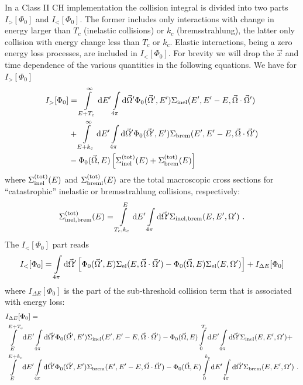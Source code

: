 In a Class II CH implementation the collision integral
is divided into two parts $I_>[\Phi_0]$ and $I_<[\Phi_0]$.
The former includes only interactions
with change in energy larger than $T_c$ (inelastic collisions)
or $k_c$ (bremsstrahlung), the latter only
collision with energy change less than
$T_c$ or $k_c$. Elastic interactions,
being a zero energy loss processes, are included in $I_<[\Phi_0]$.
For brevity we will drop the $\vec{x}$ and time dependence of the
various quantities in the following equations.
We have for $I_>[\Phi_0]$
\begin{equation}
\begin{split}
I_>[\Phi_0] & = \int\limits_{E+T_c}^\infty {\rm d}E' \int\limits_{4 \pi}
{\rm d} \vec{\Omega}' \Phi_0(\vec{\Omega}',E')
\Sigma_{\rm inel}(E',E'-E,\vec{\Omega}\cdot\vec{\Omega}') \\
& + \int\limits_{E+k_c}^\infty {\rm d}E' \int\limits_{4 \pi}
{\rm d} \vec{\Omega}' \Phi_0(\vec{\Omega}',E')
\Sigma_{\rm brem}(E',E'-E,\vec{\Omega}\cdot\vec{\Omega}')
\\
& - \Phi_0(\vec{\Omega},E)
\left[ \Sigma_{\rm inel}^{\rm (tot)}(E) + \Sigma_{\rm brem}^{\rm (tot)}(E)
\right]
\end{split}
\end{equation}
where $\Sigma_{\rm inel}^{\rm (tot)}(E)$ and
$\Sigma_{\rm breml}^{\rm (tot)}(E)$ are the total macroscopic
cross sections for ``catastrophic'' inelastic or bremsstrahlung
collisions, respectively:
\begin{equation}
\Sigma_{\rm inel,brem}^{\rm (tot)}(E) = \int\limits_{T_c,k_c}^E {\rm d} E'
\int\limits_{4 \pi} {\rm d}\vec{\Omega}'
\Sigma_{\rm inel,brem}(E,E',\Omega')~.
\end{equation}
The $I_<[\Phi_0]$ part reads
\begin{equation}
I_<[\Phi_0] = \int\limits_{4 \pi} {\rm d}\vec{\Omega}'
\left[ \Phi_0(\vec{\Omega}',E)
\Sigma_{\rm el}(E,\vec{\Omega}\cdot\vec{\Omega}') -
\Phi_0(\vec{\Omega},E) \Sigma_{\rm el}(E,\Omega') \right] +
I_{\Delta E}[\Phi_0]
\end{equation}
where $I_{\Delta E}[\Phi_0]$ is the part of the sub-threshold
collision term that is associated with energy loss:
\begin{equation}
\begin{split}
\label{I_deltaE1}
&
I_{\Delta E}[\Phi_0] = \\
&
 \int\limits_E^{E+T_c} {\rm d}E' \int\limits_{4 \pi}
{\rm d}\vec{\Omega}'\Phi_0(\vec{\Omega}',E')
\Sigma_{\rm inel}(E',E'-E,\vec{\Omega}\cdot\vec{\Omega}') -
\Phi_0(\vec{\Omega},E)
\int\limits_0^{T_c} {\rm d}E' \int\limits_{4 \pi} {\rm d}\vec{\Omega}'
\Sigma_{\rm inel}(E,E',\Omega') + \\
&
\int\limits_E^{E+k_c} {\rm d}E' \int\limits_{4 \pi}
{\rm d}\vec{\Omega}'\Phi_0(\vec{\Omega}',E')
\Sigma_{\rm brem} (E',E'-E,\vec{\Omega}\cdot\vec{\Omega}') -
\Phi_0(\vec{\Omega},E)
\int\limits_0^{k_c} {\rm d}E' \int\limits_{4 \pi} {\rm d}\vec{\Omega}'
\Sigma_{\rm brem}(E,E',\Omega')~.
\end{split}
\end{equation}
